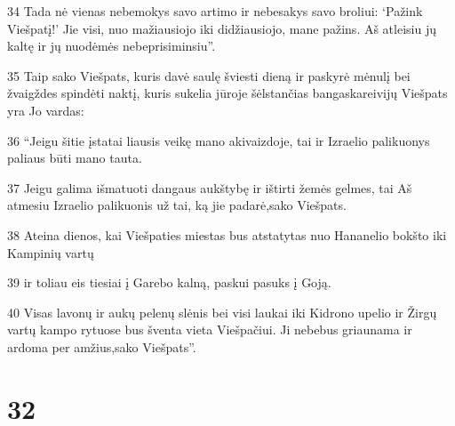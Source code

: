 \par 34 Tada nė vienas nebemokys savo artimo ir nebesakys savo broliui: ‘Pažink Viešpatį!’ Jie visi, nuo mažiausiojo iki didžiausiojo, mane pažins. Aš atleisiu jų kaltę ir jų nuodėmės nebeprisiminsiu”. 
\par 35 Taip sako Viešpats, kuris davė saulę šviesti dieną ir paskyrė mėnulį bei žvaigždes spindėti naktį, kuris sukelia jūroje šėlstančias bangas­kareivijų Viešpats yra Jo vardas: 
\par 36 “Jeigu šitie įstatai liausis veikę mano akivaizdoje, tai ir Izraelio palikuonys paliaus būti mano tauta. 
\par 37 Jeigu galima išmatuoti dangaus aukštybę ir ištirti žemės gelmes, tai Aš atmesiu Izraelio palikuonis už tai, ką jie padarė,­sako Viešpats.­ 
\par 38 Ateina dienos, kai Viešpaties miestas bus atstatytas nuo Hananelio bokšto iki Kampinių vartų 
\par 39 ir toliau eis tiesiai į Garebo kalną, paskui pasuks į Goją. 
\par 40 Visas lavonų ir aukų pelenų slėnis bei visi laukai iki Kidrono upelio ir Žirgų vartų kampo rytuose bus šventa vieta Viešpačiui. Ji nebebus griaunama ir ardoma per amžius,­sako Viešpats”.



\chapter{32}


